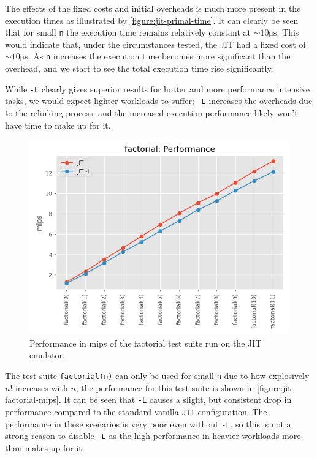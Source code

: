 The effects of the fixed costs and initial overheads is much more present in the execution times as illustrated by \autoref{figure:jit-primal-time}. It can clearly be seen that for small \texttt{n} the execution time remains relatively constant at $\sim 10\si{\micro\second}$. This would indicate that, under the circumstances tested, the JIT had a fixed cost of $\sim 10\si{\micro\second}$. As \texttt{n} increases the execution time becomes more significant than the overhead, and we start to see the total execution time rise significantly.

While \texttt{-L} clearly gives superior results for hotter and more performance intensive tasks, we would expect lighter workloads to suffer; \texttt{-L} increases the overheads due to the relinking process, and the increased execution performance likely won't have time to make up for it.

\begin{figure}[H]
    \centering
    \includegraphics[scale=0.75]{output/graphs/tests/jit/factorial/mips.png}
    \caption{Performance in mips of the factorial test suite run on the JIT emulator.}
    \label{figure:jit-factorial-mips}
\end{figure}

The test suite \texttt{factorial(n)} can only be used for small \texttt{n} due to how explosively $n!$ increases with $n$; the performance for this test suite is shown in \autoref{figure:jit-factorial-mips}. It can be seen that \texttt{-L} causes a slight, but consistent drop in performance compared to the standard vanilla \texttt{JIT} configuration. The performance in these scenarios is very poor even without \texttt{-L}, so this is not a strong reason to disable \texttt{-L} as the high performance in heavier workloads more than makes up for it.

